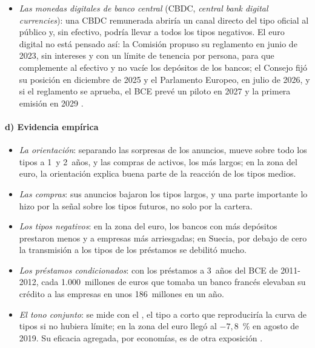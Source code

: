 \documentclass[11pt]{article}
\begin{document}
\begin{itemize}
\begin{itemize}
  \item \emph{Las monedas digitales de banco central} (CBDC, \emph{central bank digital currencies}): una CBDC remunerada abriría un canal directo del tipo oficial al público y, sin efectivo, podría llevar a todos los tipos negativos. El euro digital no está pensado así: la Comisión propuso su reglamento en junio de 2023\nocite{Comision2023EuroDigital}, sin intereses y con un límite de tenencia por persona, para que complemente al efectivo y no vacíe los depósitos de los bancos; el Consejo fijó su posición en diciembre de 2025\nocite{Consejo2025EuroDigital} y el Parlamento Europeo, en julio de 2026\nocite{PE2026EuroDigital}, y si el reglamento se aprueba, el BCE prevé un piloto en 2027 y la primera emisión en 2029\nocite{BCE2025EuroDigital} .
  \end{itemize}
\end{itemize}


\paragraph{d) Evidencia empírica}
\begin{itemize}
\item \emph{La orientación}: separando las sorpresas de los anuncios, mueve sobre todo los tipos a 1~y 2~años, y las compras de activos, los más largos\nocite{Swanson2021Measuring}; en la zona del euro, la orientación explica buena parte de la reacción de los tipos medios\nocite{AltavillaEtAl2019}.
\item \emph{Las compras}: sus anuncios bajaron los tipos largos, y una parte importante lo hizo por la señal sobre los tipos futuros, no solo por la cartera\nocite{KrishnamurthyVissingJorgensen2011Effects,BauerRudebusch2014Signaling}.
\item \emph{Los tipos negativos}: en la zona del euro, los bancos con más depósitos prestaron menos y a empresas más arriesgadas\nocite{HeiderSaidiSchepens2019Life}; en Suecia, por debajo de cero la transmisión a los tipos de los préstamos se debilitó mucho\nocite{EggertssonEtAl2024Negative}.
\item \emph{Los préstamos condicionados}: con los préstamos a 3~años del BCE de 2011-2012, cada 1.000~millones de euros que tomaba un banco francés elevaban su crédito a las empresas en unos 186~millones en un año\nocite{AndradeEtAl2019Long}.
\item \emph{El tono conjunto}: se mide con el , el tipo a corto que reproduciría la curva de tipos si no hubiera límite\nocite{WuXia2016Measuring}; en la zona del euro llegó al $-7{,}8$~\% en agosto de 2019\nocite{Wu2022Sombra}. Su eficacia agregada, por economías, es de otra exposición .
\end{itemize}
\end{document}
